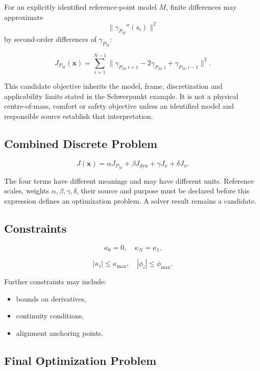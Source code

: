 For an explicitly identified reference-point model \(M\), finite differences
may approximate
\[
\|\gamma_{P_M}''(s_i)\|^2
\]
by second-order differences of \(\gamma_{P_M}\):

\[
J_{P_M}(\mathbf{x})
=
\sum_{i=1}^{N-1}
\|\gamma_{P_M,i+1} - 2\gamma_{P_M,i} + \gamma_{P_M,i-1}\|^2.
\]

This candidate objective inherits the model, frame, discretization and
applicability limits stated in the Schwerpunkt example. It is not a physical
centre-of-mass, comfort or safety objective unless an identified model and
responsible source establish that interpretation.

\subsection{Combined Discrete Problem}

\begin{definition}
\[
J(\mathbf{x})
=
\alpha J_{P_M}
+
\beta J_{\mathrm{dyn}}
+
\gamma J_\kappa
+
\delta J_\phi.
\]
\end{definition}

The four terms have different meanings and may have different units.
Reference scales, weights \(\alpha,\beta,\gamma,\delta\), their source and
purpose must be declared before this expression defines an optimization
problem. A solver result remains a candidate.

\subsection{Constraints}

\begin{definition}
\[
\kappa_0 = 0,
\quad
\kappa_N = \kappa_1.
\]
\end{definition}

\begin{definition}
\[
|\kappa_i| \le \kappa_{\max},
\quad
|\phi_i| \le \phi_{\max}.
\]
\end{definition}

Further constraints may include:
\begin{itemize}
\item bounds on derivatives,
\item continuity conditions,
\item alignment anchoring points.
\end{itemize}

\subsection{Final Optimization Problem}

